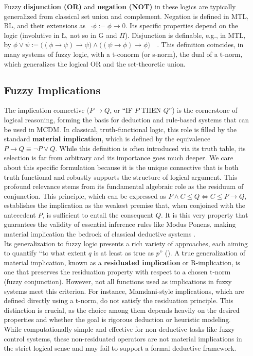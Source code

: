 Fuzzy \textbf{disjunction (OR)} and \textbf{negation (NOT)} in these logics are typically generalized from classical set union and complement. Negation is defined in MTL, BL, and their extensions as $\lnot \phi := \phi \rightarrow 0$. Its specific properties depend on the logic (involutive in \L, not so in G and $\Pi$). Disjunction is definable, e.g., in MTL, by $\phi \vee \psi := \big((\phi \rightarrow \psi) \rightarrow \psi\big) \wedge \big((\psi \rightarrow \phi) \rightarrow \phi\big)$~\cite[Def. 1]{GodoMonoidal}~\cite[Def. 2.2.1]{Hajek1998}. This definition coincides, in many systems of fuzzy logic, with a t-conorm (or s-norm), the dual of a t-norm, which generalizes the logical OR and the set-theoretic union.

\subsection{Fuzzy Implications}

The implication connective ($P \rightarrow Q$, or ``IF $P$ THEN $Q$'') is the cornerstone of logical reasoning, forming the basis for deduction and rule-based systems that can be used in MCDM. In classical, truth-functional logic, this role is filled by the standard \textbf{material implication}, which is defined by the equivalence $P \rightarrow Q \equiv \neg P \lor Q$. While this definition is often introduced via its truth table, its selection is far from arbitrary and its importance goes much deeper. We care about this specific formulation because it is the unique connective that is both truth-functional and robustly supports the structure of logical argument. This profound relevance stems from its fundamental algebraic role as the residuum of conjunction. This principle, which can be expressed as $P \land C \le Q \iff C \le P \rightarrow Q$, establishes the implication as the weakest premise that, when conjoined with the antecedent $P$, is sufficient to entail the consequent $Q$. It is this very property that guarantees the validity of essential inference rules like Modus Ponens, making material implication the bedrock of classical deductive systems \cite{KORNELL_2023}.\\

Its generalization to fuzzy logic presents a rich variety of approaches, each aiming to quantify ``to what extent $q$ is at least as true as $p$'' (\cite[p.57]{FULLER2}). A true generalization of material implication, known as a \textbf{residuated implication} or R-implication, is one that preserves the residuation property with respect to a chosen t-norm (fuzzy conjunction). However, not all functions used as implications in fuzzy systems meet this criterion. For instance, Mamdani-style implications, which are defined directly using a t-norm, do not satisfy the residuation principle. This distinction is crucial, as the choice among them depends heavily on the desired properties and whether the goal is rigorous deduction or heuristic modeling. While computationally simple and effective for non-deductive tasks like fuzzy control systems, these non-residuated operators are not material implications in the strict logical sense and may fail to support a formal deductive framework.


